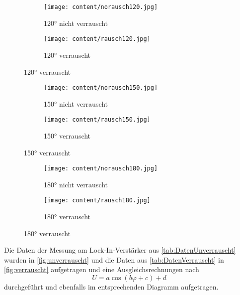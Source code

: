 \begin{figure}[H]  
  \centering
  \begin{subfigure}{0.48\textwidth}
    \centering
    \texttt{[image: content/norausch120.jpg]}
    \caption{120° nicht verrauscht}
    \label{subfig:norausch120}
  \end{subfigure}
  \hfill
  \begin{subfigure}{0.48\textwidth}
    \centering
    \texttt{[image: content/rausch120.jpg]}
    \caption{120° verrauscht}
    \label{subfig:rausch120}
  \end{subfigure}
\end{figure}
\begin{figure}[H]  
  \centering
  \begin{subfigure}{0.48\textwidth}
    \centering
    \texttt{[image: content/norausch150.jpg]}
    \caption{150° nicht verrauscht}
    \label{subfig:norausch150}
  \end{subfigure}
  \hfill
  \begin{subfigure}{0.48\textwidth}
    \centering
    \texttt{[image: content/rausch150.jpg]}
    \caption{150° verrauscht}
    \label{subfig:rausch150}
  \end{subfigure}
\end{figure}
\begin{figure}[H]  
  \centering
  \begin{subfigure}{0.48\textwidth}
    \centering
    \texttt{[image: content/norausch180.jpg]}
    \caption{180° nicht verrauscht}
    \label{subfig:norausch180}
  \end{subfigure}
  \hfill
  \begin{subfigure}{0.48\textwidth}
    \centering
    \texttt{[image: content/rausch180.jpg]}
    \caption{180° verrauscht}
    \label{subfig:rausch180}
  \end{subfigure}
\end{figure}
Die Daten der Messung am Lock-In-Verstärker aus \autoref{tab:DatenUnverrauscht} wurden in \autoref{fig:unverrauscht} und die Daten aus \autoref{tab:DatenVerrauscht} in \autoref{fig:verrauscht} aufgetragen
und eine Ausgleichsrechnungen nach
\begin{equation*}
  U = a\cos\left(b\varphi + c\right) + d
\end{equation*}
durchgeführt und ebenfalls im entsprechenden Diagramm aufgetragen.
